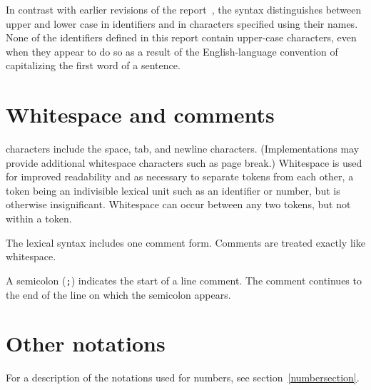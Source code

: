 In contrast with earlier revisions of the report~\cite{R5RS}, the
syntax distinguishes between upper and lower case in
identifiers and in characters specified using their names.
None of the identifiers defined in this report contain upper-case
characters, even when they appear to do so as a result
of the English-language convention of capitalizing the first word of
a sentence.


\section{Whitespace and comments}
\label{wscommentsection}

 characters include the space, tab, and newline characters.
(Implementations may provide additional whitespace characters such
as page break.)  Whitespace is used for improved readability and
as necessary to separate tokens from each other, a token being an
indivisible lexical unit such as an identifier or number, but is
otherwise insignificant.  Whitespace can occur between any two tokens,
but not within a token.

The lexical syntax includes one comment form.
Comments are treated exactly like whitespace.

A semicolon ({\tt;}) indicates the start of a line
comment.\mainschindex{;}  The comment continues to the
end of the line on which the semicolon appears.

\section{Other notations}


For a description of the notations used for numbers, see
section~\ref{numbersection}.

